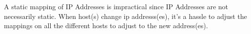 A static mapping of IP Addresses is impractical since IP Addresses are not necessarily static. When host(s) change ip addresss(es), it's a hassle to adjust the mappings on all the different hosts to adjust to the new address(es).